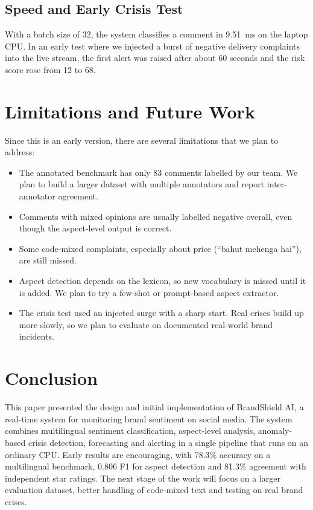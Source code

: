 \documentclass[conference]{IEEEtran}
\begin{document}
\subsection{Speed and Early Crisis Test}
With a batch size of 32, the system classifies a comment in 9.51~ms on the laptop CPU. In an early
test where we injected a burst of negative delivery complaints into the live stream, the first alert
was raised after about 60 seconds and the risk score rose from 12 to 68.

\section{Limitations and Future Work}

Since this is an early version, there are several limitations that we plan to address:
\begin{itemize}
\item The annotated benchmark has only 83 comments labelled by our team. We plan to build a larger
dataset with multiple annotators and report inter-annotator agreement.
\item Comments with mixed opinions are usually labelled negative overall, even though the aspect-level
output is correct.
\item Some code-mixed complaints, especially about price (``bahut mehenga hai''), are still missed.
\item Aspect detection depends on the lexicon, so new vocabulary is missed until it is added. We plan
to try a few-shot or prompt-based aspect extractor.
\item The crisis test used an injected surge with a sharp start. Real crises build up more slowly, so
we plan to evaluate on documented real-world brand incidents.
\end{itemize}

\section{Conclusion}

This paper presented the design and initial implementation of BrandShield AI, a real-time system for
monitoring brand sentiment on social media. The system combines multilingual sentiment
classification, aspect-level analysis, anomaly-based crisis detection, forecasting and alerting in a
single pipeline that runs on an ordinary CPU. Early results are encouraging, with 78.3\% accuracy on a
multilingual benchmark, 0.806 F1 for aspect detection and 81.3\% agreement with independent star
ratings. The next stage of the work will focus on a larger evaluation dataset, better handling of
code-mixed text and testing on real brand crises.
\end{document}
